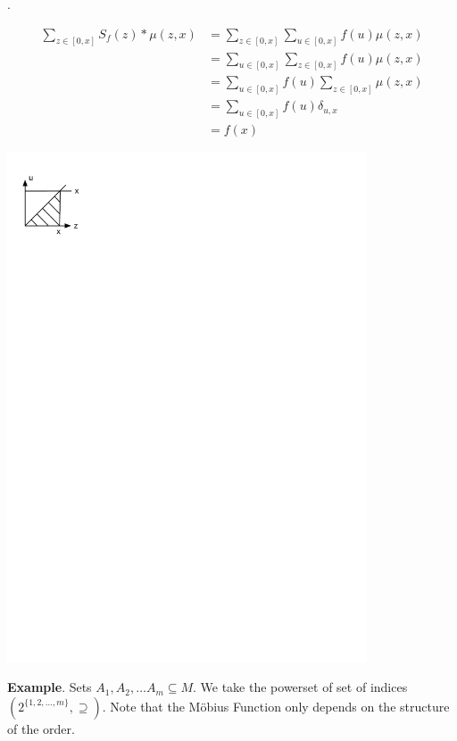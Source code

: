 \Proof.
\begin{minipage}[t]{0.6\textwidth}
  \begin{align*}
      \sum_{z \in [0,x]} S_f(z) * \mu(z,x)
      &= \sum_{z \in [0,x]} \sum_{u \in [0,x]} f(u) \mu(z,x) \\
      &= \sum_{u \in [0,x]} \sum_{z \in [0,x]} f(u) \mu(z,x) \\
      &= \sum_{u \in [0,x]} f(u) \sum_{z \in [0,x]} \mu(z,x) \\
      &= \sum_{u \in [0,x]} f(u) \delta_{u,x} \\
      &= f(x)
  \end{align*}
\end{minipage}
\begin{minipage}[t]{0.3\textwidth}
  \vspace{1.2cm}
  \begin{center}
    \includegraphics[width=0.8\textwidth]
      {02_higher_combinatorics/pics/MoebiusSum}
  \end{center}
\end{minipage}

\textbf{Example}.
Sets $A_1, A_2, \ldots A_m \subseteq M$. We take the powerset of set of indices $(2^{\{1,2, \ldots , m\}}, \supseteq)$. 
Note that the Möbius Function only depends on the structure of the order. 

